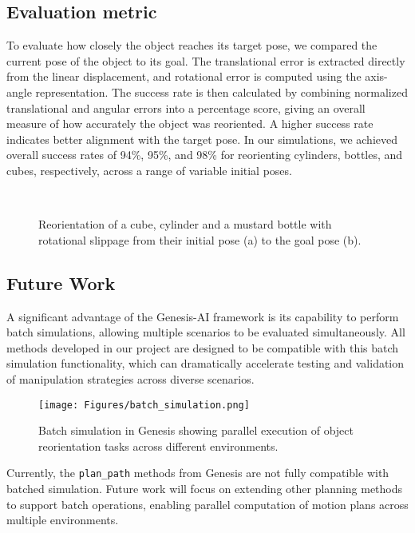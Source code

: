 \documentclass{article}
\begin{document}
\subsection{Evaluation metric}
To evaluate how closely the object reaches its target pose, we compared the current pose of the object to its goal. The translational error is extracted directly from the linear displacement, and rotational error is computed using the axis-angle representation.
The success rate is then calculated by combining normalized translational and angular errors into a percentage score, giving an overall measure of how accurately the object was reoriented. A higher success rate indicates better alignment with the target pose. In our simulations, we achieved overall success rates of 94\%, 95\%, and 98\% for reorienting cylinders, bottles, and cubes, respectively, across a range of variable initial poses.
\begin{figure}[!htbp]
\centering
     \quad \,
    \caption{Reorientation of a cube, cylinder and a mustard bottle with rotational slippage from their initial pose (a) to the goal pose (b).}
\label{Fig:Reoriantion}
\end{figure}

\subsection{Future Work}

A significant advantage of the Genesis-AI framework is its capability to perform batch simulations, allowing multiple scenarios to be evaluated simultaneously. All methods developed in our project are designed to be compatible with this batch simulation functionality, which can dramatically accelerate testing and validation of manipulation strategies across diverse scenarios.

\begin{figure}[!htbp]
\centering
\texttt{[image: Figures/batch\_simulation.png]}
\caption{Batch simulation in Genesis showing parallel execution of object reorientation tasks across different environments.}
\label{Fig:BatchSimulation}
\end{figure}

Currently, the \texttt{plan\_path} methods from Genesis are not fully compatible with batched simulation. Future work will focus on extending other planning methods to support batch operations, enabling parallel computation of motion plans across multiple environments. 
\end{document}
